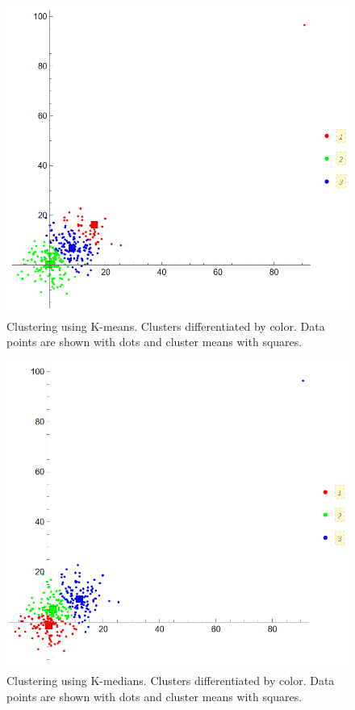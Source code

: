 \documentclass[11pt]{article}
\begin{document}
	\begin{figure}[H] %
		\centering\includegraphics[width=0.45\linewidth]{Kmeans.png}
		\caption{Clustering using K-means. Clusters differentiated by color. Data points are shown with dots and cluster means with squares.} %
		\label{fig:fig1}  %
	\end{figure}

	\begin{figure}[H] %
		\centering\includegraphics[width=0.45\linewidth]{Kmedians.png}
		\caption{Clustering using K-medians. Clusters differentiated by color. Data points are shown with dots and cluster means with squares.} %
		\label{fig:fig2}  %
	\end{figure}
	
\end{document}
